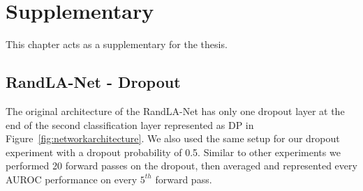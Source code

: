 


    \chapter{Supplementary}
    This chapter acts as a supplementary for the thesis.
    \section{RandLA-Net - Dropout}
    \label{sec:randladout}
    The original architecture of the RandLA-Net has only one dropout layer at the end of the second classification layer represented as DP in Figure~\ref{fig:networkarchitecture}.
    We also used the same setup for our dropout experiment with a dropout probability of 0.5.
    Similar to other experiments we performed 20 forward passes on the dropout, then averaged and represented every AUROC performance on every $5^{th}$ forward pass.

